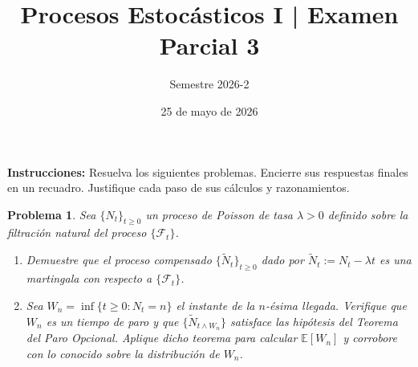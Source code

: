 \documentclass[12pt]{article}
\title{Procesos Estocásticos I | Examen Parcial 3}
\author{Semestre 2026-2}
\date{25 de mayo de 2026}
\newtheorem{problem}{Problema}
\begin{document}
\maketitle
\vspace{-0.8cm}
\small
\textbf{Instrucciones:} Resuelva los siguientes problemas. Encierre sus respuestas finales en un recuadro. Justifique cada paso de sus cálculos y razonamientos.


\begin{problem}
Sea $\{N_t\}_{t \geq 0}$ un proceso de Poisson de tasa $\lambda > 0$ definido sobre la filtración natural del proceso
$\{\mathcal{F}_t\}$.
\begin{enumerate}
    \item[(a)] Demuestre que el proceso compensado $\{\widetilde{N}_t\}_{t\geq 0}$ dado por $\widetilde{N}_t := N_t - \lambda t$ es una
        martingala con respecto a $\{\mathcal{F}_t\}$.
    \item[(b)] Sea $W_n = \inf\{t \geq 0 : N_t = n\}$ el instante de la $n$-ésima llegada.
        Verifique que $W_n$ es un tiempo de paro y que $\{\widetilde{N}_{t\wedge W_n}\}$
        satisface las hipótesis del Teorema del Paro Opcional. Aplique dicho teorema para
        calcular $\mathbb{E}[W_n]$ y corrobore con lo conocido sobre la distribución de $W_n$.
\end{enumerate}
\end{problem}
\end{document}
